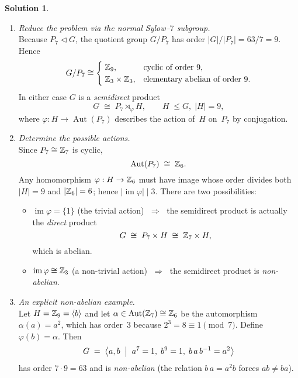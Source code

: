\documentclass[12pt]{article}
\theoremstyle{definition} %
\newtheorem{solution}{Solution}
\theoremstyle{plain} %
\begin{document}
\begin{solution}
  \begin{enumerate}[]
      \item \emph{Reduce the problem via the normal Sylow--$7$ subgroup.}\\
            Because $P_{7}\lhd G$, the quotient group $G/P_{7}$ has order
            $|G|/|P_{7}| = 63/7 = 9$.  Hence
            \[
                G/P_{7}\cong
                \begin{cases}
                     \;\Bbb Z_{9}, &\text{cyclic of order }9,\\
                     \;\Bbb Z_{3}\times\Bbb Z_{3}, &\text{elementary abelian of order }9.
                \end{cases}
            \]
            In either case $G$ is a \emph{semidirect} product
            \[
                G \;\cong\; P_{7}\rtimes_{\!\varphi}H,
                \qquad H\;\le G,\; |H|=9,
            \]
            where $\varphi:H\to\operatorname{Aut}(P_{7})$ describes the action of~$H$ on~$P_{7}$ by conjugation.
      \item \emph{Determine the possible actions.}\\
            Since $P_{7}\cong\Bbb Z_{7}$ is cyclic,
            \[
                \operatorname{Aut}(P_{7})\;\cong\;\Bbb Z_{6}.
            \]
            Any homomorphism $\varphi:H\to\Bbb Z_{6}$ must have image whose order divides both $|H|=9$ and $|\Bbb Z_{6}|=6$; hence $|\operatorname{im}\varphi|\mid 3$.
            There are two possibilities:
            \begin{itemize}
                \item $\operatorname{im}\varphi = \{1\}$ (the trivial action) $\;\Longrightarrow\;$ the semidirect product is actually the \emph{direct} product
                      \[
                          G\;\cong\;P_{7}\times H\;\cong\;\Bbb Z_{7}\times H,
                      \]
                      which is abelian.
                \item $\operatorname{im}\varphi \cong \Bbb Z_{3}$ (a non-trivial action) $\;\Longrightarrow\;$ the semidirect product is \emph{non-abelian}.
            \end{itemize}
      \item \emph{An explicit non-abelian example.}\\
            Let $H=\Bbb Z_{9}=\langle b\rangle$ and let
            \(
               \alpha\in\operatorname{Aut}(\Bbb Z_{7})\cong\Bbb Z_{6}
            \)
            be the automorphism $\alpha(a)=a^{2}$, which has order~$3$ because
            $2^{3}=8\equiv 1\pmod{7}$.
            Define $\varphi(b)=\alpha$.  Then
            \[
                G \;=\; \bigl\langle
                       a,b \;\bigm|\;
                       a^{7}=1,\; b^{9}=1,\;
                       b\,a\,b^{-1}=a^{2}
                     \bigr\rangle
            \]
            has order $7\cdot9=63$ and is \emph{non-abelian} (the relation
            $b\,a = a^{2}b$ forces $ab\ne ba$).
  \end{enumerate}
  

\end{solution}
\end{document}
